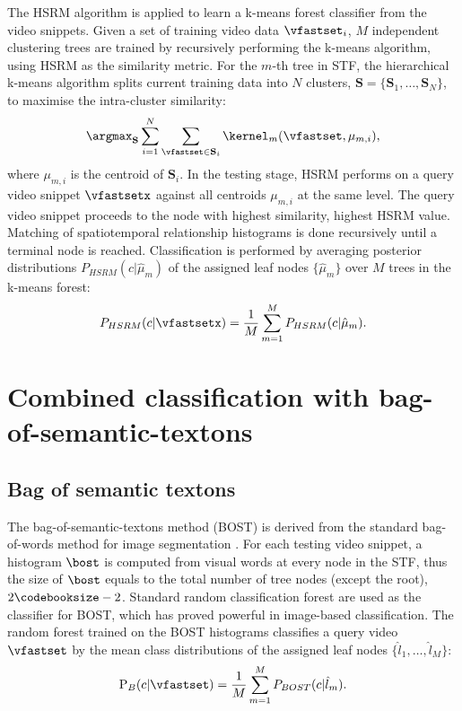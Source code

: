 The HSRM algorithm is applied to learn a k-means forest classifier from the video snippets. Given a set of training video data $\vfastset_i$, $M$ independent clustering trees are trained by recursively performing the k-means algorithm, using HSRM as the similarity metric. 
For the $m$-th tree in STF, the hierarchical k-means algorithm splits current training data into $N$ clusters, $\mathbf{S} = \{\mathbf{S}_1,\dots,\mathbf{S}_N\}$, to maximise the intra-cluster similarity:
\begin{equation}
	\displaystyle\argmax_{\mathbf{S}} \displaystyle\sum_{i = 1}^{N}\sum_{\vfastset \in \mathbf{S}_{i}} \kernel_m(\vfastset, \mu_{m,i}),
	\label{eqn/act/kmeans}
\end{equation}
where $\mu_{m,i}$ is the centroid of $\mathbf{S}_i$. In the testing stage, HSRM performs on a query video snippet $\vfastsetx$ against all centroids $\mu_{m,i}$ at the same level. The query video snippet proceeds to the node with highest similarity, \ie highest HSRM value. Matching of spatiotemporal relationship histograms is done recursively until a terminal node is reached. Classification is performed by averaging posterior distributions $P_{HSRM}(c|\hat{\mu}_{m})$ of the assigned leaf nodes $\{ \hat{\mu}_m \}$ over $M$ trees in the k-means forest: 
\begin{equation}
	P_{HSRM}(c|\vfastsetx) = 
	\frac{1}{M}\displaystyle\sum_{m=1}^{M}P_{HSRM}(c|\hat{\mu}_{m}).
	\label{eqn/act/kmeansforest}
\end{equation}

\section{Combined classification with bag-of-semantic-textons}
\label{sec/act/combine}

\subsection{Bag of semantic textons}
The bag-of-semantic-textons method (BOST) is derived from the standard bag-of-words method for image segmentation \cite{Shotton2008}. For each testing video snippet, a histogram $\bost$ is computed from visual words at every node in the STF, thus the size of $\bost$ equals to the total number of tree nodes (except the root), \ie $2\codebooksize - 2$.  
Standard random classification forest \cite{Breiman2001} are used as the classifier for BOST, which has proved powerful in image-based classification. 
The random forest trained on the BOST histograms classifies a query video $\vfastset$ by the mean class distributions of the assigned leaf nodes $\{\hat{l}_1,\dots,\hat{l}_{M}\}$:
\begin{equation}
\mathrm{P}_{B}(c|\vfastset) = \frac{1}{M}\displaystyle\sum_{m=1}^{M}P_{BOST}(c|\hat{l}_m).
\label{eqn/act/bost}
\end{equation}


